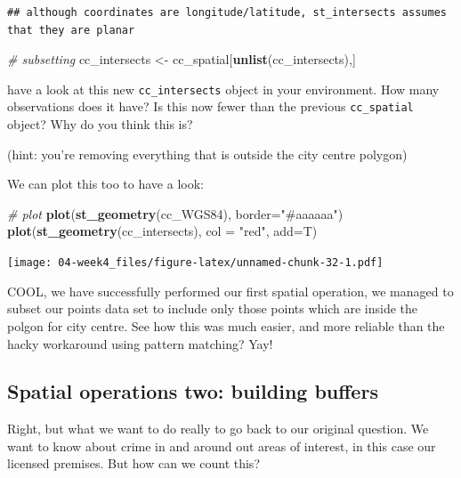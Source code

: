 \documentclass[]{book}
\newenvironment{Shaded}{\begin{snugshade}}{\end{snugshade}}
\newcommand{\CommentTok}[1]{\textcolor[rgb]{0.56,0.35,0.01}{\textit{#1}}}
\newcommand{\DataTypeTok}[1]{\textcolor[rgb]{0.13,0.29,0.53}{#1}}
\newcommand{\KeywordTok}[1]{\textcolor[rgb]{0.13,0.29,0.53}{\textbf{#1}}}
\newcommand{\NormalTok}[1]{#1}
\newcommand{\StringTok}[1]{\textcolor[rgb]{0.31,0.60,0.02}{#1}}
\begin{document}
\begin{verbatim}
## although coordinates are longitude/latitude, st_intersects assumes that they are planar
\end{verbatim}

\begin{Shaded}
\begin{Highlighting}[]
\CommentTok{# subsetting}
\NormalTok{cc_intersects <-}\StringTok{ }\NormalTok{cc_spatial[}\KeywordTok{unlist}\NormalTok{(cc_intersects),]}
\end{Highlighting}
\end{Shaded}

have a look at this new \texttt{cc\_intersects} object in your environment. How many observations does it have? Is this now fewer than the previous \texttt{cc\_spatial} object? Why do you think this is?

(hint: you're removing everything that is outside the city centre polygon)

We can plot this too to have a look:

\begin{Shaded}
\begin{Highlighting}[]
\CommentTok{# plot}
\KeywordTok{plot}\NormalTok{(}\KeywordTok{st_geometry}\NormalTok{(cc_WGS84), }\DataTypeTok{border=}\StringTok{"#aaaaaa"}\NormalTok{)}
\KeywordTok{plot}\NormalTok{(}\KeywordTok{st_geometry}\NormalTok{(cc_intersects), }\DataTypeTok{col =} \StringTok{"red"}\NormalTok{, }\DataTypeTok{add=}\NormalTok{T)}
\end{Highlighting}
\end{Shaded}

\texttt{[image: 04-week4\_files/figure-latex/unnamed-chunk-32-1.pdf]}

COOL, we have successfully performed our first spatial operation, we managed to subset our points data set to include only those points which are inside the polgon for city centre. See how this was much easier, and more reliable than the hacky workaround using pattern matching? Yay!

\hypertarget{spatial-operations-two-building-buffers}{%
\subsection{Spatial operations two: building buffers}\label{spatial-operations-two-building-buffers}}

Right, but what we want to do really to go back to our original question. We want to know about crime in and around out areas of interest, in this case our licensed premises. But how can we count this?
\end{document}
